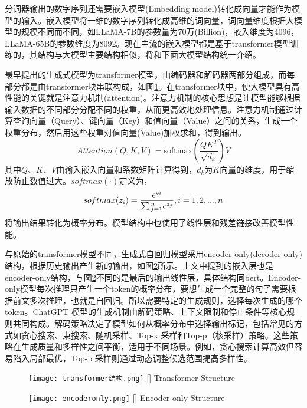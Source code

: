 分词器输出的数字序列还需要嵌入模型(Embedding model)转化成向量才能作为模型的输入。嵌入模型将一维的数字序列转化成高维的词向量，词向量维度根据大模型的规模不同而不同，如LLaMA-7B的参数量为70万(Billion)，嵌入维度为4096，LLaMA-65B的参数维度为8092。现在主流的嵌入模型都是基于transformer\cite{devlinBertPretrainingDeep2018}模型训练的，其结构与大模型主要结构相似，将和下面大模型结构统一介绍。

最早提出的生成式模型为transformer\cite{vaswaniAttentionAllYou2017}模型，由编码器和解码器两部分组成，而每部分都是由transformer块串联构成，如图\ref{fig:transformer}。在transformer块中，使大模型具有高性能的关键就是注意力机制(attention)。注意力机制的核心思想是让模型能够根据输入数据的不同部分分配不同的权重，从而更高效地处理信息。注意力机制通过计算查询向量（Query）、键向量（Key）和值向量（Value）之间的关系，生成一个权重分布，然后用这些权重对值向量(Value)加权求和，得到输出。
\begin{equation}
  \label{eq:attention}
  Attention(Q,K,V) = \text{softmax}\left(\frac{QK^T}{\sqrt{d_k}}\right)V
\end{equation}
其中$Q$、$K$、$V$由输入嵌入向量和系数矩阵计算得到，$d_k$为$K$向量的维度，用于缩放防止数值过大。$softmax(\cdot )$定义为，
\begin{equation}
  \label{eq:softmax}
  softmax({z_i}) = \frac{{{e^{{z_i}}}}}{{\sum {_{j = 1}^n{e^{{z_j}}}} }},{\rm{  }}i = 1,2,...,n
\end{equation}
将输出结果转化为概率分布。模型结构中也使用了线性层和残差链接\cite{heDeepResidualLearning2016}改善模型性能。

与原始的transformer模型不同，生成式自回归模型采用encoder-only(decoder-only)结构，根据历史输出产生新的输出，如图\ref{fig:encodel}所示。上文中提到的嵌入层也是encoder-only结构，与图\ref{fig:encodel}不同的是最后的输出线性层，具体结构同bert\cite{devlinBertPretrainingDeep2018}。Encoder-only模型每次推理只产生一个token的概率分布，要想生成一个完整的句子需要根据前文多次推理，也就是自回归。所以需要特定的生成规则，选择每次生成的哪个token。ChatGPT 模型的生成机制由解码策略、上下文限制和停止条件等核心规则共同构成。解码策略决定了模型如何从概率分布中选择输出标记，包括常见的方式如贪心搜索\cite{bahdanauNeuralMachineTranslation2016}、束搜索\cite{sutskeverSequenceSequenceLearning2014}、随机采样\cite{radfordImprovingLanguageUnderstanding2018}、Top-k\cite{fanHierarchicalNeuralStory2018} 采样和Top-p（核采样）\cite{holtzmanCuriousCaseNeural2020}策略。这些策略在生成质量和多样性之间平衡，适用于不同场景。例如，贪心搜索计算高效但容易陷入局部最优，Top-p 采样则通过动态调整候选范围提高多样性。
\begin{figure}[htbp]
  \centering
  \texttt{[image: transformer结构.png]}
  []{ Transformer Structure}
  \label{fig:transformer}
\end{figure}
\begin{figure}[!htbp]
  \centering
  \texttt{[image: encoderonly.png]}
  []{ Encoder-only Structure}
  \label{fig:encodel}
\end{figure}


